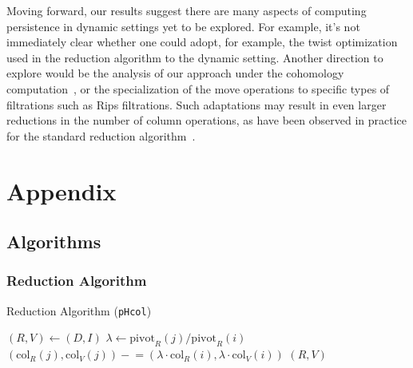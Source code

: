 \documentclass[sn-mathphys]{sn-jnl}
\begin{document}
Moving forward, our results suggest there are many aspects of computing persistence in dynamic settings yet to be explored. For example, it's not immediately clear whether one could adopt, for example, the twist optimization~\cite{chen2011persistent} used in the reduction algorithm to the dynamic setting. Another direction to explore would be the analysis of our approach under the cohomology computation~\cite{de2011dualities}, or the specialization of the move operations to specific types of filtrations such as Rips filtrations. Such adaptations may result in even larger reductions in the number of column operations, as have been observed in practice for the standard reduction algorithm~\cite{bauer2021ripser}. 


%
%


\newpage 
\appendix
\section{Appendix}

\subsection{Algorithms}

\subsubsection{Reduction Algorithm}
\begin{algorithm}[t]
	\caption{Reduction Algorithm (\texttt{pHcol}) }
	\begin{algorithmic}[1]
		\State $(R, V) \gets (D, I)$
				\State $\lambda \gets \mathrm{pivot}_R(j)/\mathrm{pivot}_R(i)$
				\State $(\mathrm{col}_R(j), \mathrm{col}_V(j)) \mathrel{-}= \left ( \lambda \cdot \mathrm{col}_R(i), \lambda \cdot \mathrm{col}_V(i) \right )$
			\EndWhile
		\EndFor 
		\State \Return $(R, V)$
		\EndFunction
	\end{algorithmic}	\label{alg:reduce}
\end{algorithm}
\end{document}
